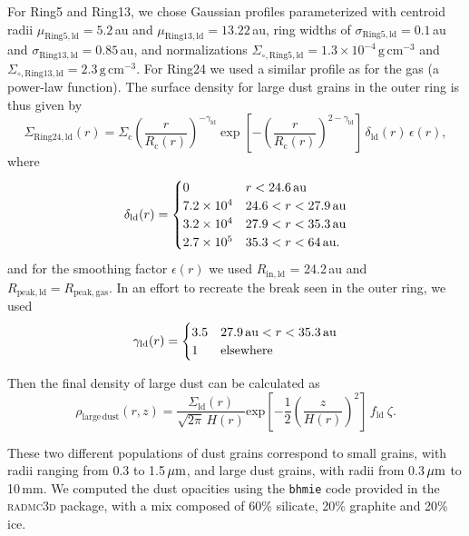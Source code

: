 \documentclass[fleqn,usenatbib,useAMS]{mnras}
\begin{document}
For Ring5 and Ring13, we chose Gaussian profiles parameterized with centroid radii $\mu_{\mathrm{Ring5, ld}}=5.2$\,au and $\mu_{\mathrm{Ring13, ld}}=13.22$\,au, ring widths of $\sigma_{\mathrm{Ring5,ld}}=0.1$\,au and $\sigma_{\mathrm{Ring13,ld}}=0.85$\,au, and normalizations $\Sigma_{\circ,\mathrm{Ring5,ld}}=1.3\times10^{-4}\,\mathrm{g\,cm^{-3}}$ and $\Sigma_{\circ,\mathrm{Ring13,ld}}=2.3\,\mathrm{g\,cm^{-3}}$. For Ring24 we used a similar profile as for the gas (a power-law function). The surface density for large dust grains in the outer ring is thus given by
\begin{equation}
    \Sigma_{\mathrm{Ring24,ld}}(r) = \Sigma_{\mathrm{c}} \left(\frac{r}{R_{\mathrm{c}}(r)}\right)^{-\gamma_{\mathrm{ld}}} \exp\left[-\left(\frac{r}{R_{\mathrm{c}}(r)}\right)^{2-\gamma_{\mathrm{ld}}}\right]\,\delta_{\mathrm{ld}}(r) \,\epsilon(r),
\end{equation}
where
\begin{equation}
  \delta_{\mathrm{ld}}(r) =
  \begin{cases}
  0                 & r < 24.6\text{\,au} \\
  7.2 \times10^{4} & 24.6 < r < 27.9\text{\,au} \\
  3.2 \times10^{4} & 27.9 < r < 35.3\text{\,au} \\
  2.7 \times10^{5} & 35.3 < r < 64\text{\,au.} \\
  \end{cases}
\end{equation}
and for the smoothing factor $\epsilon(r)$ we used $R_\mathrm{in,ld}$ = 24.2\,au and $R_\mathrm{peak,ld} = R_\mathrm{peak,gas}$. In an effort to recreate the break seen in the outer ring, we used
\begin{equation}
  \gamma_{\mathrm{ld}}(r) =
  \begin{cases}
  3.5 & 27.9\text{\,au} < r < 35.3\text{\,au} \\
    1                 &  {\rm elsewhere} \\
  \end{cases}
\end{equation}

Then the final density of large dust can be calculated as
\begin{equation}
\rho_{\mathrm{large\,dust}}(r,z)=
\frac{\Sigma_{\mathrm{ld}}(r)}{\sqrt{2\pi} \, H(r)} \mathrm{exp}\left[-\frac{1}{2} \left(\frac{z}{H(r)}\right)^2\right] \, f_{\mathrm{ld}} \: \zeta.
\end{equation}

These two different populations of dust grains correspond to small grains, with radii ranging from 0.3 to 1.5\,$\hbox{$\mu$m}$, and large dust grains, with radii from 0.3\,$\hbox{$\mu$m}$ to 10\,mm. We computed the dust opacities using the {\tt bhmie} code provided in the \textsc{radmc3d} package, with a mix composed of 60\% silicate, 20\% graphite and 20\% ice.
\end{document}
